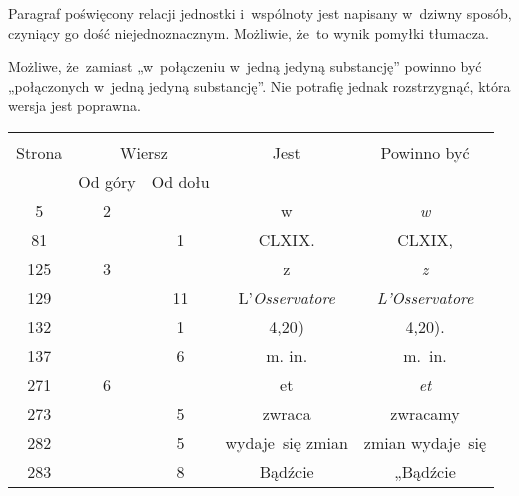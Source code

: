 \documentclass[a4paper,11pt]{article}
\begin{document}
\vspace{\spaceFour}





\start {} Paragraf poświęcony relacji jednostki i~wspólnoty
jest napisany w~dziwny sposób, czyniący go dość niejednoznacznym.
Możliwie, że~to wynik pomyłki tłumacza.

\vspace{\spaceFour}





\start {} Możliwe, że~zamiast „w~połączeniu w~jedną jedyną
substancję” powinno być „połączonych w~jedną jedyną substancję”.
Nie potrafię jednak rozstrzygnąć, która wersja jest poprawna.








\begin{center}

  \begin{tabular}{|c|c|c|c|c|}
    \hline
    & \multicolumn{2}{c|}{} & & \\
    Strona & \multicolumn{2}{c|}{Wiersz} & Jest
                              & Powinno być \\ \cline{2-3}
    & Od góry & Od dołu & & \\
    \hline
    5   &  2 & & w & \textit{w} \\
    81  & &  1 & CLXIX. & CLXIX, \\
    125 &  3 & & z & \textit{z} \\
    129 & & 11 & L'\textit{Osservatore} & \textit{L'Osservatore} \\
    132 & &  1 & 4,20) & 4,20). \\
    137 & &  6 & m.\hspace{1em} in. & m.~in.\\
    271 &  6 & & et & \textit{et} \\
    273 & &  5 & zwraca & zwracamy \\
    282 & &  5 & wydaje~się zmian & zmian wydaje~się \\
    283 & &  8 & Bądźcie & „Bądźcie \\
    \hline
  \end{tabular}

\end{center}
\end{document}
